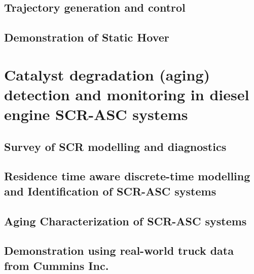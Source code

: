 \documentclass{PurdueThesis}
\begin{document}
\chapter{Trajectory generation and control}
\chapter{Demonstration of Static Hover}

\part{Catalyst degradation (aging) detection and monitoring in diesel engine SCR-ASC systems}
\chapter{Survey of SCR modelling and diagnostics}
\chapter{Residence time aware discrete-time modelling and Identification of SCR-ASC systems}
\chapter{Aging Characterization of SCR-ASC systems}
\chapter{Demonstration using real-world truck data from Cummins Inc.}


%
%


\end{document}
